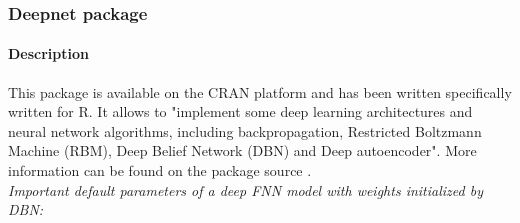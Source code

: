 \documentclass[letter,8pt]{article}\usepackage[]{graphicx}\usepackage[]{color}
\begin{document}
\subsubsection{Deepnet package}
\paragraph{Description}
This package is available on the CRAN platform and has been written specifically written for R. It allows to "implement some deep learning architectures and neural network algorithms, including backpropagation, Restricted Boltzmann Machine (RBM), Deep Belief Network (DBN) and Deep autoencoder". More information can be found on the package source \cite{deepnet2015}.\\
\textit{Important default parameters of a deep FNN model with weights initialized by DBN:}
\end{document}
